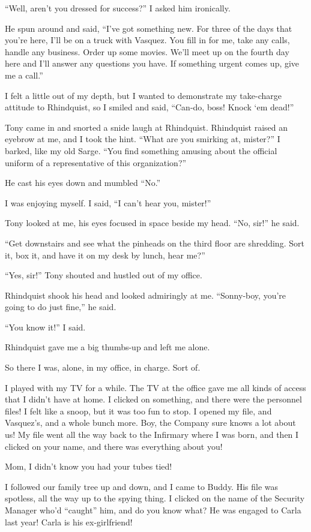 “Well, aren't you dressed for success?” I asked him ironically.

He spun around and said, “I've got something new. For three of the 
days that you're here, I'll be on a truck with Vasquez. You fill in for 
me, take any calls, handle any business. Order up some movies. We'll 
meet up on the fourth day here and I'll answer any questions you have. 
If something urgent comes up, give me a call.”

I felt a little out of my depth, but I wanted to demonstrate my 
take-charge attitude to Rhindquist, so I smiled and said, “Can-do, 
boss! Knock `em dead!”

Tony came in and snorted a snide laugh at Rhindquist. Rhindquist raised 
an eyebrow at me, and I took the hint. “What are you smirking at, 
mister?” I barked, like my old Sarge. “You find something amusing 
about the official uniform of a representative of this organization?”

He cast his eyes down and mumbled “No.”

I was enjoying myself. I said, “I can't hear you, mister!”

Tony looked at me, his eyes focused in space beside my head. “No, 
sir!” he said.

“Get downstairs and see what the pinheads on the third floor are 
shredding. Sort it, box it, and have it on my desk by lunch, hear me?”

“Yes, sir!” Tony shouted and hustled out of my office.

Rhindquist shook his head and looked admiringly at me. “Sonny-boy, 
you're going to do just fine,” he said.

“You know it!” I said.

Rhindquist gave me a big thumbs-up and left me alone.

So there I was, alone, in my office, in charge. Sort of.

I played with my TV for a while. The TV at the office gave me all kinds 
of access that I didn't have at home. I clicked on something, and there 
were the personnel files! I felt like a snoop, but it was too fun to 
stop. I opened my file, and Vasquez's, and a whole bunch more. Boy, the 
Company sure knows a lot about us! My file went all the way back to the 
Infirmary where I was born, and then I clicked on your name, and there 
was everything about you!

Mom, I didn't know you had your tubes tied!

I followed our family tree up and down, and I came to Buddy. His file 
was spotless, all the way up to the spying thing. I clicked on the name 
of the Security Manager who'd “caught” him, and do you know what? 
He was engaged to Carla last year! Carla is his ex-girlfriend!

